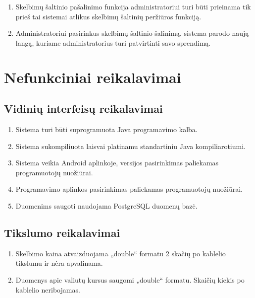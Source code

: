 \documentclass[12pt]{article}
\begin{document}
	\begin{enumerate}[resume,labelindent=10pt,leftmargin=2.2cm]
		\item Skelbimų šaltinio pašalinimo funkcija administratoriui turi būti prieinama tik prieš tai sistemai atlikus skelbimų šaltinių peržiūros funkciją.
		\item Administratoriui pasirinkus skelbimų šaltinio šalinimą, sistema parodo naują langą, kuriame administratorius turi patvirtinti savo sprendimą.
	\end{enumerate}
	\pagebreak
	
	\renewcommand{\thesubsection}{NFR\arabic{subsection}}
	\renewcommand*{\theenumi}{\thesubsection.\arabic{enumi}}
	\renewcommand*{\theenumii}{\theenumi.\arabic{enumii}}
	\section*{Nefunkciniai reikalavimai}
	\setcounter{subsection}{0}
	
	\subsection{Vidinių interfeisų reikalavimai}
	\begin{enumerate}[labelindent=10pt,leftmargin=2.2cm]
		\item Sistema turi būti suprogramuota Java programavimo kalba.
		\item Sistema sukompiliuota laisvai platinamu standartiniu Java kompiliarotiumi.
		\item Sistema veikia Android aplinkoje, versijos pasirinkimas paliekamas programuotojų nuožiūrai.
		\item Programavimo aplinkos pasirinkimas paliekamas programuotojų nuožiūrai.
		\item Duomenims saugoti naudojama PostgreSQL duomenų bazė.
	\end{enumerate}	
	
	
	\subsection{Tikslumo reikalavimai}
	\begin{enumerate}[labelindent=10pt,leftmargin=2.2cm]
		\item Skelbimo kaina atvaizduojama „double“ formatu 2 skačių po kablelio tikslumu ir nėra apvalinama.
		\item Duomenys apie valiutų kursus saugomi „double“ formatu. Skaičių kiekis po kablelio neribojamas.
	\end{enumerate}	
	
\end{document}

